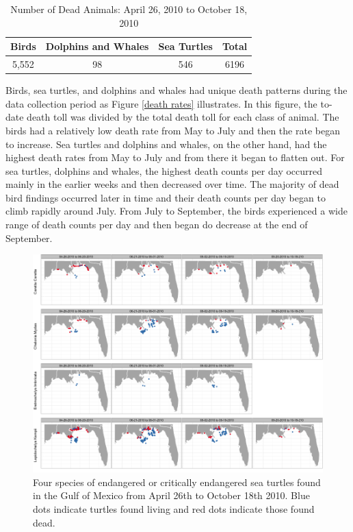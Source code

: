 \documentclass[11pt]{article}
\begin{document}
\begin{table}[ht]
\caption{Number of Dead Animals: April 26, 2010 to October 18, 2010}
\centering
\begin{tabular}{c c c c}
\hline\hline
Birds & Dolphins and Whales & Sea Turtles & Total \\ [0.5ex]
\hline
5,552 & 98 & 546 & 6196\\ [1ex]
\hline
\end{tabular}
\label{table:table1}
\end{table}

Birds, sea turtles, and dolphins and whales had unique death patterns during the data collection period as Figure \ref{death rates}  illustrates. In this figure, the to-date death toll was divided by the total death toll for each class of animal. The birds had a relatively low death rate from May to July and then the rate began to increase. Sea turtles and dolphins and whales, on the other hand, had the highest death rates from May to July and from there it began to flatten out. For sea turtles, dolphins and whales, the highest death counts per day occurred mainly in the earlier weeks and then decreased over time.  The majority of dead bird findings occurred later in time and their death counts per day began to climb rapidly around July. From July to September, the birds experienced a wide range of death counts per day and then began do decrease at the end of September.   

\begin{figure}[htbp] %
   \centering
   \includegraphics[width=6in]{turtles.png} 
   \caption{Four species of endangered or critically endangered sea turtles found in the Gulf of Mexico from April 26th to October 18th 2010.  Blue dots indicate turtles found living and red dots indicate those found dead.}
   \label{turtles}
\end{figure}
\end{document}
